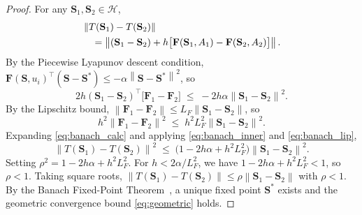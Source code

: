 \documentclass[10pt,twocolumn]{article}
\theoremstyle{plain}
\theoremstyle{definition}
\theoremstyle{remark}
\newcommand{\Hcal}{\mathcal{H}}
\newcommand{\norm}[1]{\left\|#1\right\|}
\newcommand{\Sstar}{\mathbf{S}^{*}}
\begin{document}
\begin{proof}
For any $\mathbf{S}_1, \mathbf{S}_2 \in \Hcal$,
\begin{align}
  &\norm{T(\mathbf{S}_1) - T(\mathbf{S}_2)} \notag\\
  &\quad= \norm{(\mathbf{S}_1 - \mathbf{S}_2)
       + h\bigl[\mathbf{F}(\mathbf{S}_1,A_1) -
                \mathbf{F}(\mathbf{S}_2,A_2)\bigr]}.
  \label{eq:banach_calc}
\end{align}
By the Piecewise Lyapunov descent condition,
$\mathbf{F}(\mathbf{S},u_i)^\top(\mathbf{S}-\Sstar)
\leq -\alpha\norm{\mathbf{S}-\Sstar}^2$, so
\begin{equation}
  2h(\mathbf{S}_1-\mathbf{S}_2)^\top
  \bigl[\mathbf{F}_1-\mathbf{F}_2\bigr]
  \;\leq\; -2h\alpha\norm{\mathbf{S}_1-\mathbf{S}_2}^2.
  \label{eq:banach_inner}
\end{equation}
By the Lipschitz bound,
$\norm{\mathbf{F}_1-\mathbf{F}_2} \leq L_F\norm{\mathbf{S}_1-\mathbf{S}_2}$,
so
\begin{equation}
  h^2\norm{\mathbf{F}_1-\mathbf{F}_2}^2
  \;\leq\; h^2 L_F^2 \norm{\mathbf{S}_1-\mathbf{S}_2}^2.
  \label{eq:banach_lip}
\end{equation}
Expanding \eqref{eq:banach_calc} and applying \eqref{eq:banach_inner}
and \eqref{eq:banach_lip},
\begin{equation}
  \norm{T(\mathbf{S}_1)-T(\mathbf{S}_2)}^2
  \;\leq\; \bigl(1 - 2h\alpha + h^2 L_F^2\bigr)
           \norm{\mathbf{S}_1-\mathbf{S}_2}^2.
  \label{eq:banach_sq}
\end{equation}
Setting $\rho^2 = 1 - 2h\alpha + h^2 L_F^2$.  For
$h < 2\alpha/L_F^2$, we have $1 - 2h\alpha + h^2 L_F^2 < 1$, so
$\rho < 1$.  Taking square roots, $\norm{T(\mathbf{S}_1)-T(\mathbf{S}_2)}
\leq \rho\norm{\mathbf{S}_1-\mathbf{S}_2}$ with $\rho < 1$.  By the
Banach Fixed-Point Theorem~\cite{Kreyszig1989}, a unique fixed point
$\Sstar$ exists and the geometric convergence bound \eqref{eq:geometric}
holds.
\end{proof}
\end{document}
